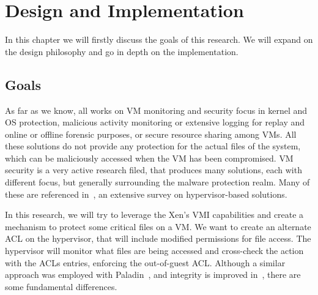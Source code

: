 
\chapter{Design and Implementation}\label{ch:chapter3}

In this chapter we will firstly discuss the goals of this research. We will expand on the design philosophy and go in depth on the implementation.

\section{Goals}\label{sec:goals}

As far as we know, all works on \ac{VM} monitoring and security focus in kernel and \ac{OS} protection, malicious activity monitoring or extensive logging for replay and online or offline forensic purposes, or secure resource sharing among \ac{VM}s. All these solutions do not provide any protection for the actual files of the system, which can be maliciously accessed when the \ac{VM} has been compromised. \ac{VM} security is a very active research filed, that produces many solutions, each with different focus, but generally surrounding the malware protection realm. Many of these are referenced in~\cite{bauman2015survey}, an extensive survey on hypervisor-based solutions.

\par In this research, we will try to leverage the Xen’s \ac{VMI} capabilities and create a mechanism to protect some critical files on a \ac{VM}. We want to create an alternate \ac{ACL} on the hypervisor, that will include modified permissions for file access. The hypervisor will monitor what files are being accessed and cross-check the action with the \ac{ACL}s entries, enforcing the out-of-guest \ac{ACL}. Although a similar approach was employed with Paladin~\cite{baliga2008automated}, and integrity is improved in~\cite{nasab2012security}, there are some fundamental differences. 

